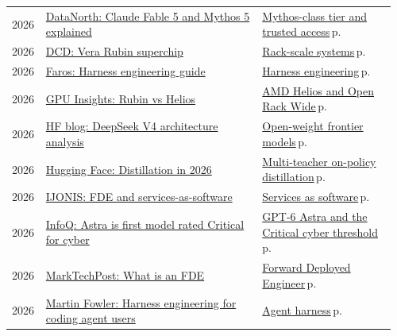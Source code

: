 \documentclass[10pt,a4paper,openany]{report}
\begin{document}
{\begin{longtable}{@{}p{0.07\linewidth}>{\raggedright}p{0.55\linewidth}>{\raggedright\arraybackslash}p{0.34\linewidth}@{}}
2026 & \href{https://datanorth.ai/news/anthropic-releases-claude-fable-5-and-mythos-5}{DataNorth: Claude Fable 5 and Mythos 5 explained} & \hyperref[c:landscape-0]{Mythos-class tier and trusted access}\,{\color{muted}\scriptsize p.\,\pageref{c:landscape-0}}\\
2026 & \href{https://www.datacenterdynamics.com/en/news/nvidia-announces-vera-rubin-superchip-for-late-2026/}{DCD: Vera Rubin superchip} & \hyperref[c:hardware-0]{Rack-scale systems}\,{\color{muted}\scriptsize p.\,\pageref{c:hardware-0}}\\
2026 & \href{https://www.faros.ai/blog/harness-engineering}{Faros: Harness engineering guide} & \hyperref[c:agents-1]{Harness engineering}\,{\color{muted}\scriptsize p.\,\pageref{c:agents-1}}\\
2026 & \href{https://gpuinsights.net/nvidia-rubin-vs-amd-helios-mi450-2026/}{GPU Insights: Rubin vs Helios} & \hyperref[c:hardware-1]{AMD Helios and Open Rack Wide}\,{\color{muted}\scriptsize p.\,\pageref{c:hardware-1}}\\
2026 & \href{https://huggingface.co/blog/ResterChed/deepseek-v4-ga-architecture}{HF blog: DeepSeek V4 architecture analysis} & \hyperref[c:landscape-3]{Open-weight frontier models}\,{\color{muted}\scriptsize p.\,\pageref{c:landscape-3}}\\
2026 & \href{https://huggingface.co/blog/sergiopaniego/distillation-2026}{Hugging Face: Distillation in 2026} & \hyperref[c:reasoning-3]{Multi-teacher on-policy distillation}\,{\color{muted}\scriptsize p.\,\pageref{c:reasoning-3}}\\
2026 & \href{https://ijonis.com/en/forward-deployed-engineer-explained}{IJONIS: FDE and services-as-software} & \hyperref[c:practice-2]{Services as software}\,{\color{muted}\scriptsize p.\,\pageref{c:practice-2}}\\
2026 & \href{https://www.infoq.com/news/2026/09/gpt-6-astra-critical-cyber/}{InfoQ: Astra is first model rated Critical for cyber} & \hyperref[c:landscape-1]{GPT-6 Astra and the Critical cyber threshold}\,{\color{muted}\scriptsize p.\,\pageref{c:landscape-1}}\\
2026 & \href{https://www.marktechpost.com/2026/05/20/what-is-a-forward-deployed-engineer-the-ai-role-openai-anthropic-and-google-are-hiring-in-2026/}{MarkTechPost: What is an FDE} & \hyperref[c:practice-0]{Forward Deployed Engineer}\,{\color{muted}\scriptsize p.\,\pageref{c:practice-0}}\\
2026 & \href{https://martinfowler.com/articles/harness-engineering.html}{Martin Fowler: Harness engineering for coding agent users} & \hyperref[c:agents-0]{Agent harness}\,{\color{muted}\scriptsize p.\,\pageref{c:agents-0}}\\

\end{longtable}}
\end{document}
